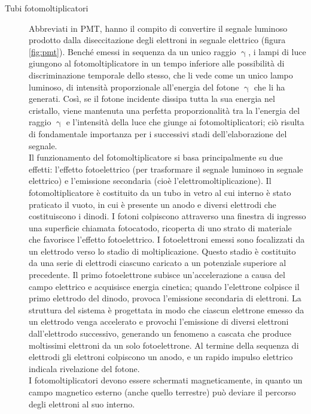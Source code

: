 \documentclass{report}
\newcommand{\figref}[1]{figura \ref{#1}}
\numberwithin{equation}{section}
\numberwithin{figure}{section}
\begin{document}
\begin{description}
\item[Tubi fotomoltiplicatori] Abbreviati in PMT, hanno il compito di convertire il segnale luminoso prodotto dalla diseccitazione degli elettroni in segnale elettrico (\figref{fig:pmt}). Benché emessi in sequenza da un unico raggio $\upgamma$, i lampi di luce giungono al fotomoltiplicatore in un tempo inferiore alle possibilità di discriminazione temporale dello stesso, che li vede come un unico lampo luminoso, di intensità proporzionale all'energia del fotone $\upgamma$ che li ha generati. Così, se il fotone incidente dissipa tutta la sua energia nel cristallo, viene mantenuta una perfetta proporzionalità tra la l'energia del raggio $\upgamma$ e l'intensità della luce che giunge ai fotomoltiplicatori; ciò risulta di fondamentale importanza per i successivi stadi dell'elaborazione del segnale.\\
Il funzionamento del fotomoltiplicatore si basa principalmente su due effetti: l’effetto fotoelettrico (per trasformare il segnale luminoso in segnale elettrico) e l’emissione secondaria (cioè l'elettromoltiplicazione). Il fotomoltiplicatore è costituito da un tubo in vetro al cui interno è stato praticato il vuoto, in cui è presente un anodo e diversi elettrodi che costituiscono i dinodi. I fotoni colpiscono attraverso una finestra di ingresso una superficie chiamata fotocatodo, ricoperta di uno strato di materiale che favorisce l’effetto fotoelettrico. I fotoelettroni emessi sono focalizzati da un elettrodo verso lo stadio di moltiplicazione. Questo stadio è costituito da una serie di elettrodi ciascuno caricato a un potenziale superiore al precedente. Il primo fotoelettrone subisce un'accelerazione a causa del campo elettrico e acquisisce energia cinetica; quando l'elettrone colpisce il primo elettrodo del dinodo, provoca l’emissione secondaria di elettroni. La struttura del sistema è progettata in modo che ciascun elettrone emesso da un elettrodo venga accelerato e provochi l'emissione di diversi elettroni dall'elettrodo successivo, generando un fenomeno a cascata che produce moltissimi elettroni da un solo fotoelettrone. Al termine della sequenza di elettrodi gli elettroni colpiscono un anodo, e un rapido impulso elettrico indicala rivelazione del fotone.\\
I fotomoltiplicatori devono essere schermati magneticamente, in quanto un campo magnetico esterno (anche quello terrestre) può deviare il percorso degli elettroni al suo interno.
\end{description}
\end{document}
